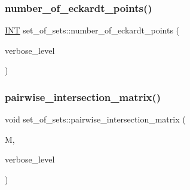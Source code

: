 \mbox{\label{classset__of__sets_acf1d8689cc8ef9c4987d86c78be68302}} 
\subsubsection{\texorpdfstring{number\+\_\+of\+\_\+eckardt\+\_\+points()}{number\_of\_eckardt\_points()}}
{\footnotesize\ttfamily \mbox{\hyperlink{galois_8h_a09fddde158a3a20bd2dcadb609de11dc}{I\+NT}} set\+\_\+of\+\_\+sets\+::number\+\_\+of\+\_\+eckardt\+\_\+points (\begin{DoxyParamCaption}\item[{\mbox{\hyperlink{galois_8h_a09fddde158a3a20bd2dcadb609de11dc}{I\+NT}}}]{verbose\+\_\+level }\end{DoxyParamCaption})}

\mbox{\label{classset__of__sets_ad866d8c98dd9d92b17b800d67050abb7}} 
\subsubsection{\texorpdfstring{pairwise\+\_\+intersection\+\_\+matrix()}{pairwise\_intersection\_matrix()}}
{\footnotesize\ttfamily void set\+\_\+of\+\_\+sets\+::pairwise\+\_\+intersection\+\_\+matrix (\begin{DoxyParamCaption}\item[{\mbox{\hyperlink{galois_8h_a09fddde158a3a20bd2dcadb609de11dc}{I\+NT}} $\ast$\&}]{M,  }\item[{\mbox{\hyperlink{galois_8h_a09fddde158a3a20bd2dcadb609de11dc}{I\+NT}}}]{verbose\+\_\+level }\end{DoxyParamCaption})}

\mbox{\label{classset__of__sets_a2da4eef3013824a9c1453ca7cdb98a9c}} 
